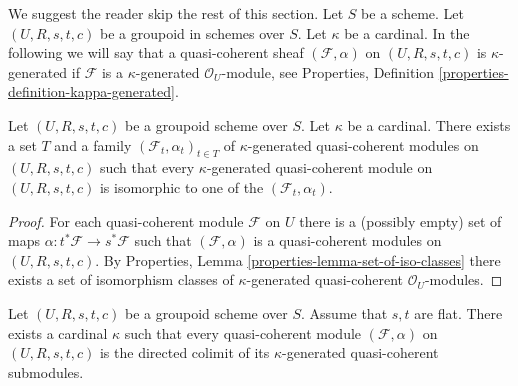 \noindent
We suggest the reader skip the rest of this section. Let $S$ be a scheme.
Let $(U, R, s, t, c)$ be a groupoid in schemes over $S$. Let $\kappa$ be a
cardinal. In the following we will say that a quasi-coherent sheaf
$(\mathcal{F}, \alpha)$ on $(U, R, s, t, c)$ is $\kappa$-generated if
$\mathcal{F}$ is a $\kappa$-generated $\mathcal{O}_U$-module, see
Properties, Definition \ref{properties-definition-kappa-generated}.

\begin{lemma}
\label{lemma-set-of-iso-classes}
Let $(U, R, s, t, c)$ be a groupoid scheme over $S$.
Let $\kappa$ be a cardinal.
There exists a set $T$ and a family $(\mathcal{F}_t, \alpha_t)_{t \in T}$ of
$\kappa$-generated quasi-coherent modules on $(U, R, s, t, c)$
such that every $\kappa$-generated quasi-coherent module on
$(U, R, s, t, c)$ is isomorphic to one of the $(\mathcal{F}_t, \alpha_t)$.
\end{lemma}

\begin{proof}
For each quasi-coherent module $\mathcal{F}$ on $U$ there is a
(possibly empty) set of maps $\alpha : t^*\mathcal{F} \to s^*\mathcal{F}$
such that $(\mathcal{F}, \alpha)$ is a quasi-coherent modules on
$(U, R, s, t, c)$. By
Properties, Lemma \ref{properties-lemma-set-of-iso-classes}
there exists a set of isomorphism classes of $\kappa$-generated
quasi-coherent $\mathcal{O}_U$-modules.
\end{proof}

\begin{lemma}
\label{lemma-colimit-kappa}
Let $(U, R, s, t, c)$ be a groupoid scheme over $S$.
Assume that $s, t$ are flat. There exists a
cardinal $\kappa$ such that every quasi-coherent module
$(\mathcal{F}, \alpha)$ on $(U, R, s, t, c)$
is the directed colimit of its $\kappa$-generated
quasi-coherent submodules.
\end{lemma}

